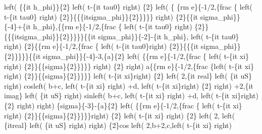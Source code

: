 \begin{maplegroup}
\begin{mapleinput}
\end{mapleinput}
\mapleresult
{}left( \{\{it h\_phi\}\}\{2\} left( t-\{it tau0\} right) \{2\} left( \{
\{rm e\}\{-1/2,\{frac \{ left( t-\{it tau0\} right) \{2\}\}\{\{\{itsigma\_phi\}\}\{2\}\}\}\}\} right) \{2\}\{\{it sigma\_phi\}\}\{-4\}+\{it h\_phi\},\{\{rm e\}\{-1/2,\{frac \{ left( t-\{it tau0\} right) \{2\}\}\{\{\{itsigma\_phi\}\}\{2\}\}\}\}\}\{\{it sigma\_phi\}\}\{-2\}-\{it h\_phi\}, left( t-\{it tau0\} right) \{2\}\{\{rm e\}\{-1/2,\{frac \{ left( t-\{it tau0\}right) \{2\}\}\{\{\{it sigma\_phi\}\}\{2\}\}\}\}\}\{\{it sigma\_phi\}\}\{-4\}-3,\{a\}\{2\} left( \{\{rm e\}\{-1/2,\{frac \{ left( t-\{it xi\} right) \{2\}\}\{\{sigma\}\{2\}\}\}\}\} right) \{2\} right) a\{\{rm e\}\{-1/2,\{frac \{left( t-\{it xi\} right) \{2\}\}\{\{sigma\}\{2\}\}\}\}\} left( t-\{it xi\}right) \{2\} left( 2,\{it real\} left( \{it uS\} right) cosleft( b+c, left( t-\{it xi\} right) +d, left( t-\{it xi\}right) \{2\} right) +2,\{it imag\} left( \{it uS\} right) sinleft( b+c, left( t-\{it xi\} right) +d, left( t-\{it xi\}right) \{2\} right)  right) \{sigma\}\{-3\}-\{a\}\{2\} left( \{\{rm e\}\{-1/2,\{frac \{ left( t-\{it xi\} right) \{2\}\}\{\{sigma\}\{2\}\}\}\}\}right) \{2\} left( t-\{it xi\} right) \{2\} left( 2, left( \{itreal\} left( \{it uS\} right)  right) \{2\}cos left( 2,b+2,c,left( t-\{it xi\} right) 
\end{maplegroup}
